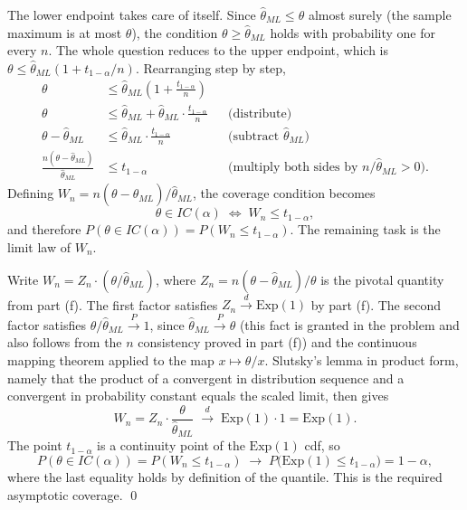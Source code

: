 The lower endpoint takes care of itself. Since $\widehat\theta_{ML} \le \theta$ almost surely (the sample maximum is at most $\theta$), the condition $\theta \ge \widehat\theta_{ML}$ holds with probability one for every $n$. The whole question reduces to the upper endpoint, which is $\theta \le \widehat\theta_{ML}(1 + t_{1-\alpha}/n)$. Rearranging step by step,
\begin{align*}
\theta &\le \widehat\theta_{ML}\left(1 + \frac{t_{1-\alpha}}{n}\right) \\
\theta &\le \widehat\theta_{ML} + \widehat\theta_{ML} \cdot \frac{t_{1-\alpha}}{n} && \text{(distribute)} \\
\theta - \widehat\theta_{ML} &\le \widehat\theta_{ML} \cdot \frac{t_{1-\alpha}}{n} && \text{(subtract $\widehat\theta_{ML}$)} \\
\frac{n(\theta - \widehat\theta_{ML})}{\widehat\theta_{ML}} &\le t_{1-\alpha} && \text{(multiply both sides by $n/\widehat\theta_{ML} > 0$)}.
\end{align*}
Defining $W_n = n(\theta - \widehat\theta_{ML})/\widehat\theta_{ML}$, the coverage condition becomes
\[
\theta \in IC(\alpha) \;\iff\; W_n \le t_{1-\alpha},
\]
and therefore $P(\theta \in IC(\alpha)) = P(W_n \le t_{1-\alpha})$. The remaining task is the limit law of $W_n$.

Write $W_n = Z_n \cdot (\theta / \widehat\theta_{ML})$, where $Z_n = n(\theta - \widehat\theta_{ML})/\theta$ is the pivotal quantity from part (f). The first factor satisfies $Z_n \overset{d}{\longrightarrow} \mathrm{Exp}(1)$ by part (f). The second factor satisfies $\theta / \widehat\theta_{ML} \overset{P}{\longrightarrow} 1$, since $\widehat\theta_{ML} \overset{P}{\longrightarrow} \theta$ (this fact is granted in the problem and also follows from the $n$ consistency proved in part (f)) and the continuous mapping theorem applied to the map $x \mapsto \theta/x$. Slutsky's lemma in product form, namely that the product of a convergent in distribution sequence and a convergent in probability constant equals the scaled limit, then gives
\[
W_n = Z_n \cdot \frac{\theta}{\widehat\theta_{ML}} \;\overset{d}{\longrightarrow}\; \mathrm{Exp}(1) \cdot 1 = \mathrm{Exp}(1).
\]
The point $t_{1-\alpha}$ is a continuity point of the $\mathrm{Exp}(1)$ cdf, so
\[
P(\theta \in IC(\alpha)) = P(W_n \le t_{1-\alpha}) \;\longrightarrow\; P\bigl(\mathrm{Exp}(1) \le t_{1-\alpha}\bigr) = 1 - \alpha,
\]
where the last equality holds by definition of the quantile. This is the required asymptotic coverage. \qed

